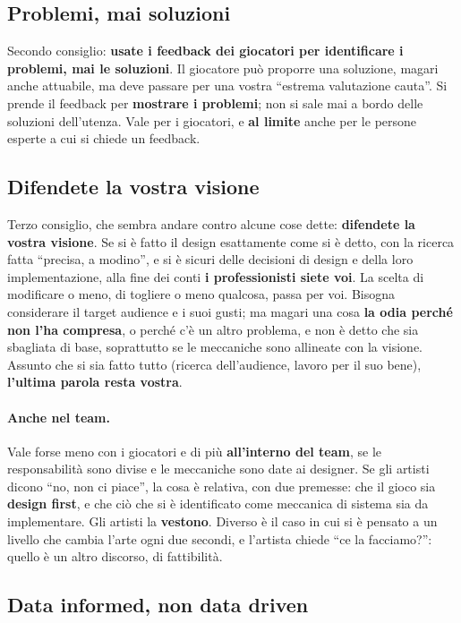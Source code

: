 \subsection{Problemi, mai soluzioni}

Secondo consiglio: \textbf{usate i feedback dei giocatori per identificare i
problemi, mai le soluzioni}. Il giocatore può proporre una soluzione, magari
anche attuabile, ma deve passare per una vostra ``estrema valutazione
cauta''. Si prende il feedback per \textbf{mostrare i problemi}; non si sale
mai a bordo delle soluzioni dell'utenza. Vale per i giocatori, e
\textbf{al limite} anche per le persone esperte a cui si chiede un feedback.

\subsection{Difendete la vostra visione}

Terzo consiglio, che sembra andare contro alcune cose dette: \textbf{difendete
la vostra visione}. Se si è fatto il design esattamente come si è detto, con
la ricerca fatta ``precisa, a modino'', e si è sicuri delle decisioni di
design e della loro implementazione, alla fine dei conti \textbf{i
professionisti siete voi}. La scelta di modificare o meno, di togliere o
meno qualcosa, passa per voi. Bisogna considerare il target audience e i
suoi gusti; ma magari una cosa \textbf{la odia perché non l'ha compresa}, o
perché c'è un altro problema, e non è detto che sia sbagliata di base,
soprattutto se le meccaniche sono allineate con la visione. Assunto che si
sia fatto tutto (ricerca dell'audience, lavoro per il suo bene),
\textbf{l'ultima parola resta vostra}.

\paragraph{Anche nel team.} Vale forse meno con i giocatori e di più
\textbf{all'interno del team}, se le responsabilità sono divise e le
meccaniche sono date ai designer. Se gli artisti dicono ``no, non ci
piace'', la cosa è relativa, con due premesse: che il gioco sia
\textbf{design first}, e che ciò che si è identificato come meccanica di
sistema sia da implementare. Gli artisti la \textbf{vestono}. Diverso è il
caso in cui si è pensato a un livello che cambia l'arte ogni due secondi, e
l'artista chiede ``ce la facciamo?'': quello è un altro discorso, di
fattibilità.

\subsection{Data informed, non data driven}

